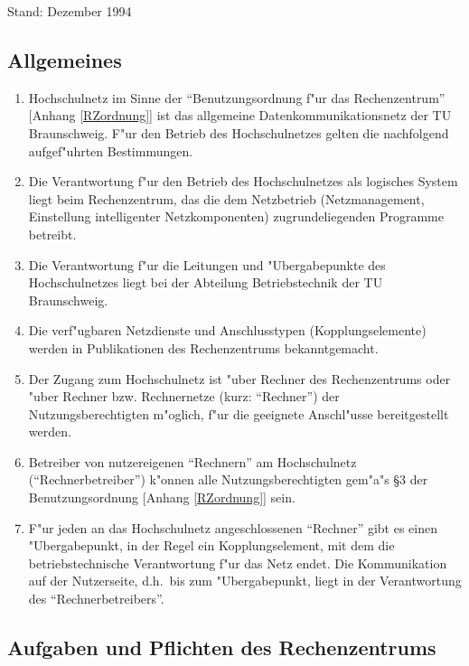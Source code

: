 \documentclass[12pt,titlepage,twoside]{scrartcl}
\begin{document}
\begin{appendix}
{\small Stand: Dezember 1994}

\subsection{Allgemeines}

\begin{enumerate}
  \item Hochschulnetz im Sinne der "`Benutzungsordnung f"ur das Rechenzentrum"'
    [Anhang \ref{RZordnung}] ist das allgemeine Datenkommunikationsnetz
    der TU Braunschweig. F"ur den Betrieb des Hochschulnetzes gelten die
    nachfolgend aufgef"uhrten Bestimmungen.

  \item Die Verantwortung f"ur den Betrieb des Hochschulnetzes
    als logisches System liegt beim Rechenzentrum, das die dem
    Netzbetrieb (Netzmanagement, Einstellung intelligenter
    Netzkomponenten) zugrundeliegenden Programme betreibt.

  \item Die Verantwortung f"ur die Leitungen und "Ubergabepunkte
    des Hochschulnetzes liegt bei der Abteilung Betriebstechnik
    der TU Braunschweig.

  \item Die verf"ugbaren Netzdienste und Anschlusstypen (Kopplungselemente)
    werden in Publikationen des Rechenzentrums bekanntgemacht.

  \item Der Zugang zum Hochschulnetz ist "uber Rechner des
    Rechenzentrums oder "uber Rechner bzw. Rechnernetze
    (kurz: "`Rechner"') der Nutzungsberechtigten m"oglich,
    f"ur die geeignete Anschl"usse bereitgestellt werden.

  \item Betreiber von nutzereigenen "`Rechnern"' am Hochschulnetz
    ("`Rechnerbetreiber"') k"onnen alle Nutzungsberechtigten
    gem"a"s \S{}3 der Benutzungsordnung [Anhang \ref{RZordnung}] sein.

  \item F"ur jeden an das Hochschulnetz angeschlossenen "`Rechner"'
    gibt es einen "Ubergabepunkt, in der Regel ein
    Kopplungselement, mit dem die betriebstechnische Verantwortung
    f"ur das Netz endet. Die Kommunikation auf der
    Nutzerseite, d.h.\  bis zum "Ubergabepunkt, liegt in der
    Verantwortung des "`Rechnerbetreibers"'.
\end{enumerate}

\subsection{Aufgaben und Pflichten des Rechenzentrums}


\end{appendix}
\end{document}
